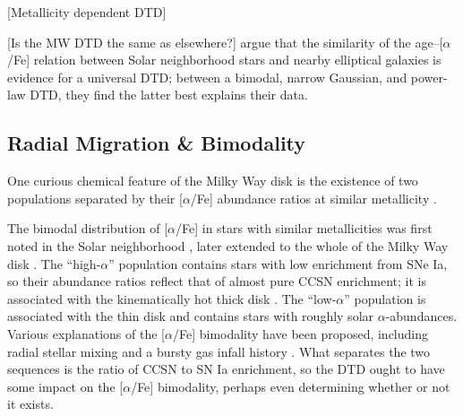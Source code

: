 \documentclass[twocolumn,twocolappendix,linenumbers,trackchanges]{aastex631}
\newcommand{\aFe}{[$\alpha$/Fe]\xspace}
\begin{document}
[Metallicity dependent DTD]

[Is the MW DTD the same as elsewhere?]
\citet{Walcher2016-SelfSimilarity} argue that the similarity of the age--[$\alpha$/Fe] relation between Solar neighborhood stars and nearby elliptical galaxies is evidence for a universal DTD; between a bimodal, narrow Gaussian, and power-law DTD, they find the latter best explains their data.

\subsection{Radial Migration \& Bimodality}

One curious chemical feature of the Milky Way disk is the existence of two populations separated by their \aFe abundance ratios at similar metallicity \citep[e.g.,][]{Bensby2014-SolarNeighborhoodAbundances}. 

The bimodal distribution of \aFe in stars with similar metallicities was first noted in the Solar neighborhood \citep[e.g.,][]{Furhmann1998-NearbyStars}, later extended to the whole of the Milky Way disk \citep{Nidever2014-ChemicalEvolutionAPOGEE,Hayden2015-ChemicalCartography}. The ``high-$\alpha$'' population contains stars with low enrichment from SNe Ia, so their abundance ratios reflect that of almost pure CCSN enrichment; it is associated with the kinematically hot thick disk \citep{Bensby2003-AbundanceTrends}. The ``low-$\alpha$'' population is associated with the thin disk and contains stars with roughly solar $\alpha$-abundances.
Various explanations of the \aFe bimodality have been proposed, including radial stellar mixing \citep{Schonrich2009-RadialMixing} and a bursty gas infall history \citep[e.g.,][]{Spitoni2021-TwoInfall}.
What separates the two sequences is the ratio of CCSN to SN Ia enrichment, so the DTD ought to have some impact on the \aFe bimodality, perhaps even determining whether or not it exists.
\end{document}
